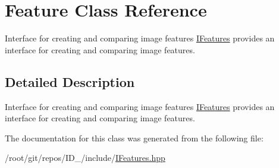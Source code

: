 \hypertarget{classFeature}{\section{\-Feature \-Class \-Reference}
\label{classFeature}
}


\-Interface for creating and comparing image features \hyperlink{classIFeatures}{\-I\-Features} provides an interface for creating and comparing image features.  




\subsection{\-Detailed \-Description}
\-Interface for creating and comparing image features \hyperlink{classIFeatures}{\-I\-Features} provides an interface for creating and comparing image features. 

\-The documentation for this class was generated from the following file\-:\begin{DoxyCompactItemize}
\item 
/root/git/repos/\-I\-D\-\_/include/\hyperlink{IFeatures_8hpp}{\-I\-Features.\-hpp}\end{DoxyCompactItemize}
